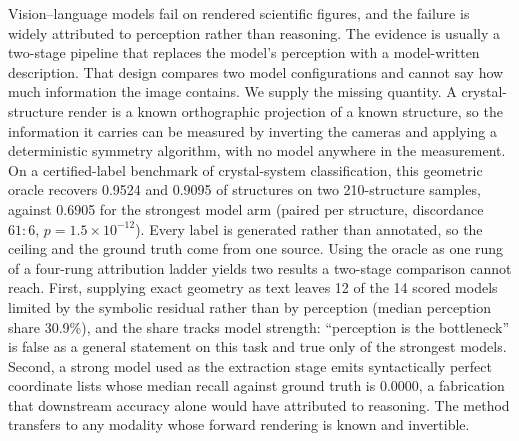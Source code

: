 Vision--language models fail on rendered scientific figures, and the failure is widely attributed to
perception rather than reasoning. The evidence is usually a two-stage pipeline that replaces the model's
perception with a model-written description. That design compares two model configurations and cannot say
how much information the image contains. We supply the missing quantity. A crystal-structure render is a
known orthographic projection of a known structure, so the information it carries can be measured by
inverting the cameras and applying a deterministic symmetry algorithm, with no model anywhere in the
measurement. On a certified-label benchmark of crystal-system classification, this geometric oracle
recovers 0.9524 and 0.9095 of structures on two 210-structure samples, against 0.6905 for the strongest
model arm (paired per structure, discordance $61{:}6$, $p = 1.5\times10^{-12}$). Every label is generated rather than annotated,
so the ceiling and the ground truth come from one source. Using the oracle as one rung of a four-rung
attribution ladder yields two results a two-stage comparison cannot reach. First, supplying exact geometry
as text leaves 12 of the 14 scored models limited by the symbolic residual rather than by perception
(median perception share 30.9\%), and the share tracks model strength: ``perception is the bottleneck'' is
false as a general statement on this task and true only of the strongest models. Second, a strong model
used as the extraction stage emits syntactically perfect coordinate lists whose median recall against
ground truth is 0.0000, a fabrication that downstream accuracy alone would have attributed to reasoning.
The method transfers to any modality whose forward rendering is known and invertible.
